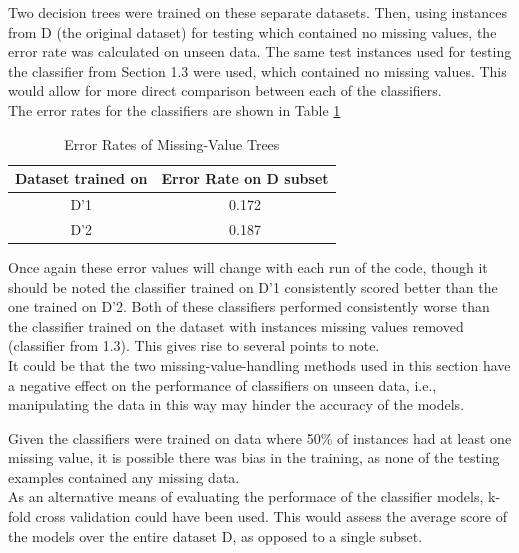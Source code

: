 \documentclass{article}
\begin{document}
Two decision trees were trained on these separate datasets. Then, using instances from D (the original dataset) for testing which contained no missing values, 
the error rate was calculated on unseen data. The same test instances used for testing the classifier from Section 1.3 were used, which contained
no missing values. This would allow for more direct comparison between each of the classifiers.\\

The error rates for the classifiers are shown in Table \ref{table:errs}

\vspace{4mm}
\begin{table}
{
        \centering
        \label{table:errs}
        \begin{tabular}{|c|c|}
        \hline
        Dataset trained on & Error Rate on D subset\\
        \hline
        D'1 & 0.172\\ 
        D'2 & 0.187\\
        \hline
       \end{tabular}
\caption{Error Rates of Missing-Value Trees}
}
\end{table}

\vspace{4mm}

Once again these error values will change with each run of the code, though it should be noted the classifier trained on D'1 consistently 
scored better than the one trained on D'2. Both of these classifiers performed consistently worse than the classifier trained on the dataset with instances missing values 
removed (classifier from 1.3). This gives rise to several points to note.\\

It could be that the two missing-value-handling methods used in this section have a negative effect on the performance of classifiers
on unseen data, i.e., manipulating the data in this way may hinder the accuracy of the models.

Given the classifiers were trained on data where 50\% of instances had at least one missing value, it is possible there was bias in the 
training, as none of the testing examples contained any missing data.\\

As an alternative means of evaluating the performace of the classifier models, k-fold cross validation could have been used. This would assess the 
average score of the models over the entire dataset D, as opposed to a single subset.
\end{document}
